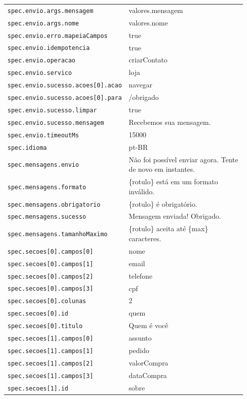 \begin{tabular}{@{}p{0.35\linewidth}p{0.6\linewidth}@{}}
\texttt{spec.envio.args.mensagem} & valores.mensagem \\
\texttt{spec.envio.args.nome} & valores.nome \\
\texttt{spec.envio.erro.mapeiaCampos} & true \\
\texttt{spec.envio.idempotencia} & true \\
\texttt{spec.envio.operacao} & criarContato \\
\texttt{spec.envio.servico} & loja \\
\texttt{spec.envio.sucesso.acoes[0].acao} & navegar \\
\texttt{spec.envio.sucesso.acoes[0].para} & /obrigado \\
\texttt{spec.envio.sucesso.limpar} & true \\
\texttt{spec.envio.sucesso.mensagem} & Recebemos sua mensagem. \\
\texttt{spec.envio.timeoutMs} & 15000 \\
\texttt{spec.idioma} & pt-BR \\
\texttt{spec.mensagens.envio} & Não foi possível enviar agora. Tente de novo em instantes. \\
\texttt{spec.mensagens.formato} & \{rotulo\} está em um formato inválido. \\
\texttt{spec.mensagens.obrigatorio} & \{rotulo\} é obrigatório. \\
\texttt{spec.mensagens.sucesso} & Mensagem enviada! Obrigado. \\
\texttt{spec.mensagens.tamanhoMaximo} & \{rotulo\} aceita até \{max\} caracteres. \\
\texttt{spec.secoes[0].campos[0]} & nome \\
\texttt{spec.secoes[0].campos[1]} & email \\
\texttt{spec.secoes[0].campos[2]} & telefone \\
\texttt{spec.secoes[0].campos[3]} & cpf \\
\texttt{spec.secoes[0].colunas} & 2 \\
\texttt{spec.secoes[0].id} & quem \\
\texttt{spec.secoes[0].titulo} & Quem é você \\
\texttt{spec.secoes[1].campos[0]} & assunto \\
\texttt{spec.secoes[1].campos[1]} & pedido \\
\texttt{spec.secoes[1].campos[2]} & valorCompra \\
\texttt{spec.secoes[1].campos[3]} & dataCompra \\
\texttt{spec.secoes[1].id} & sobre \\

\end{tabular}
